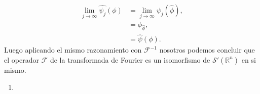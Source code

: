 \begin{homeworkProblem}
\begin{solution}
    \begin{align*}
      \lim_{j \to \infty}\hat{\psi_{j}}(\phi)&=\lim_{j \to \infty}\psi_{j}(\hat{\phi}),\\
      &=\phi_{\hat{\phi}},\\
      &=\hat{\psi}(\phi).
    \end{align*}
    Luego aplicando el mismo razonamiento con $\mathcal{F}^{-1}$ nosotros podemos concluir que el operador $\mathcal{F}$ de la transformada de Fourier es un isomorfismo de $\mathcal{S}'(\mathbb{R}^{n})$ en si mismo.
    \begin{enumerate}
      \item 
    \end{enumerate}
  \end{solution}
\end{homeworkProblem}

